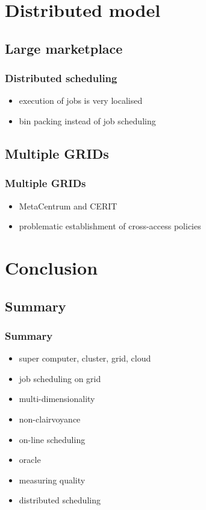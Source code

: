 \section{Distributed model}
\subsection{Large marketplace}

\begin{frame}
	\frametitle{Distributed scheduling}
	\pause
	\begin{itemize}
		\item execution of jobs is very localised \pause
		\item bin packing instead of job scheduling
	\end{itemize}
\end{frame}

\subsection{Multiple GRIDs}

\begin{frame}
	\frametitle{Multiple GRIDs}
	\begin{itemize}
		\item MetaCentrum and CERIT
		\item problematic establishment of cross-access policies
	\end{itemize}
\end{frame}


\section{Conclusion}
\subsection{Summary}

\begin{frame}
\frametitle{Summary}
	\begin{itemize}
		\item super computer, cluster, grid, cloud \pause
		\item job scheduling on grid \pause
		\item multi-dimensionality \pause
		\item non-clairvoyance \pause
		\item on-line scheduling \pause
		\item oracle \pause
		\item measuring quality \pause
		\item distributed scheduling
	\end{itemize}
\end{frame}

